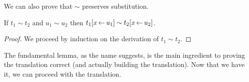We can also prove that $\sim$ preserves substitution.

\begin{lemma}
  If $t_1 \sim t_2$ and $u_1 \sim u_2$ then
  $t_1[x \mathop{\leftarrow} u_1] \sim t_2[x \mathop{\leftarrow} u_2]$.
\end{lemma}

\begin{proof}
  We proceed by induction on the derivation of $t_1 \sim t_2$.
\end{proof}

The fundamental lemma, as the name suggests, is the main ingredient to proving
the translation correct (and actually building the translation). Now that we
have it, we can proceed with the translation.